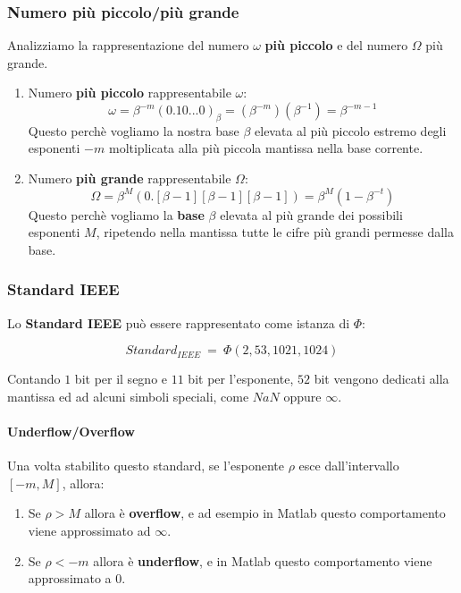 \documentclass{article}
\begin{document}
\subsubsection{Numero più piccolo/più grande}

Analizziamo la rappresentazione del numero $\omega$ \textbf{più piccolo} e del numero $\Omega$ più grande.

\begin{enumerate}
    \item Numero \textbf{più piccolo} rappresentabile $\omega$:
    \[ \omega = \beta^{-m}(0.10...0)_{\beta} = (\beta^{-m})(\beta^{-1}) = \beta^{-m-1} \]
Questo perchè vogliamo la nostra base $\beta$ elevata al più piccolo estremo degli esponenti $-m$ moltiplicata alla più piccola mantissa nella base corrente.
    \item Numero \textbf{più grande} rappresentabile $\Omega$:
    \[ \Omega = \beta^{M}(0.[\beta-1][\beta-1][\beta-1]) = \beta^{M}(1-\beta^{-t}) \]
Questo perchè vogliamo la \textbf{base} $\beta$ elevata al più grande dei possibili esponenti $M$, ripetendo nella mantissa tutte le cifre più grandi permesse dalla base.
    
\end{enumerate}

\vspace*{10px}

\subsubsection{Standard IEEE}

Lo \textbf{Standard IEEE} può essere rappresentato come istanza di $\Phi$:

\[ Standard_{IEEE}\:=\:\Phi(2,53,1021,1024) \]

Contando $1$ bit per il segno e $11$ bit per l'esponente, $52$ bit vengono dedicati alla mantissa ed ad alcuni simboli speciali, come $NaN$ oppure $\infty$.

\vspace*{10px}

\paragraph{Underflow/Overflow} Una volta stabilito questo standard, se l'esponente $\rho$ esce \newline dall'intervallo $[-m,M]$, allora:

\begin{enumerate}
    \item Se $\rho > M$ allora è \textbf{overflow}, e ad esempio in Matlab questo comportamento viene approssimato ad $\infty$.
    \item Se $\rho < -m$ allora è \textbf{underflow}, e in Matlab questo comportamento viene approssimato a $0$.
\end{enumerate}
\end{document}

